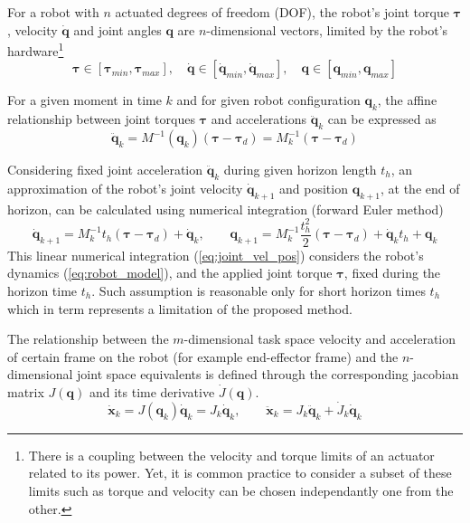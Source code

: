 For a robot with $n$ actuated degrees of freedom (DOF), the robot's joint torque $\bm{\tau}$, velocity $\dot{\bm{q}}$ and joint angles $\bm{q}$ are $n$-dimensional vectors, limited by the robot's hardware\footnote{There is a coupling between the velocity and torque limits of an actuator related to its power. Yet, it is common practice to consider a subset of these limits such as torque and velocity can be chosen independantly one from the other.}
\begin{equation}
 \bm{\tau}\in\left[\bm{\tau}_{min},\bm{\tau}_{max}\right], \quad 
 \dot{\bm{q}}\in\left[\dot{\bm{q}}_{min},\dot{\bm{q}}_{max}\right], \quad \bm{q}\in\left[\bm{q}_{min},\bm{q}_{max}\right]
 \label{eq:limits}
\end{equation}


For a given moment in time $k$ and for given robot configuration $\bm{q}_k$, the affine relationship between joint torques $\bm{\tau}$ and accelerations $\ddot{\bm{q}}_{k}$ can be expressed as
\begin{equation}
    \ddot{\bm{q}}_{k} = M^{-1}(\bm{q}_k)(\bm{\tau} - \bm{\tau}_d) = M_k^{-1}(\bm{\tau} - \bm{\tau}_d)
\end{equation}

Considering fixed joint acceleration $\ddot{\bm{q}}_{k}$ during given horizon length $t_h$, an approximation of the robot's joint velocity $\dot{\bm{q}}_{k+1}$ and position $\bm{q}_{k+1}$, at the end of horizon, can be calculated using numerical integration (forward Euler method) 
\begin{equation}
    \dot{\bm{q}}_{k+1} = M_k^{-1}t_h(\bm{\tau} - \bm{\tau}_d) + \dot{\bm{q}}_{k}, \qquad \bm{q}_{k+1} = M_k^{-1}\frac{t_h^2}{2}(\bm{\tau} - \bm{\tau}_d) + \dot{\bm{q}}_{k}t_h + \bm{q}_{k}
    \label{eq:joint_vel_pos}
\end{equation}
This linear numerical integration (\ref{eq:joint_vel_pos}) considers the robot's dynamics (\ref{eq:robot_model}), and the applied joint torque $\bm{\tau}$, fixed during the horizon time $t_h$. Such assumption is reasonable only for short horizon times $t_h$ which in term represents a limitation of the proposed method.

The relationship between the $m$-dimensional task space velocity and acceleration of certain frame on the robot (for example end-effector frame) and the $n$-dimensional joint space equivalents is defined through the corresponding jacobian matrix $J(\bm{q})$ and its time derivative $\dot{J}(\bm{q})$. 
\begin{equation}
    \dot{\bm{x}}_k = J(\bm{q}_k)\dot{\bm{q}}_k = J_k \dot{\bm{q}}_k, \qquad  \ddot{\bm{x}}_k = J_k \ddot{\bm{q}}_k + \dot{J}_k \dot{\bm{q}}_k
\end{equation}

